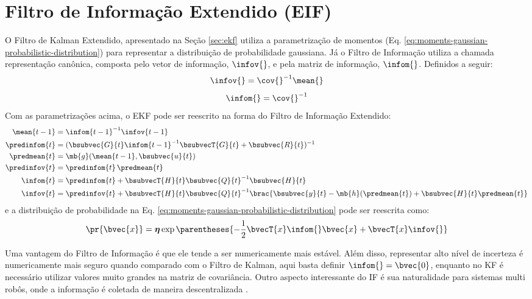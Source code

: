 \section{Filtro de Informação Extendido (EIF)}
O Filtro de Kalman Extendido, apresentado na Seção \ref{sec:ekf} utiliza a
parametrização de momentos (Eq. \ref{eq:moments-gaussian-probabilistic-distribution}) para representar a 
distribuição de probabilidade 
gaussiana. Já o Filtro de Informação utiliza a chamada representação canônica, composta pelo vetor de informação, $\infov{}$, e pela matriz de informação, $\infom{}$. Definidos a seguir:
\newcommand{\ifcorrespondence}{\infov{} = \cov{}^{-1} \mean{}}
\begin{equation}
  \ifcorrespondence 
  \label{eq:info-vector}
\end{equation}
\begin{equation}
  \infom{} = \cov{}^{-1}
  \label{eq:info-matrix}
\end{equation}
Com as parametrizações acima, o EKF pode ser reescrito na forma do Filtro de 
Informação Extendido:
\begin{align}
  \mean{t-1} &= \infom{t-1}^{-1} \infov{t-1}
  \label{eq:eif-mean-recuperation} \\
  \predinfom{t} &= (\bsubvec{G}{t} \infom{t-1}^{-1} \bsubvecT{G}{t} + \bsubvec{R}{t})^{-1}
  \label{eq:eif-info-matrix-prediction}\\
  \predmean{t} &= \mb{g}(\mean{t-1}, \bsubvec{u}{t})
  \label{eq:eif-mean-prediction} \\
  \predinfov{t} &= \predinfom{t}\,\predmean{t}
  \label{eq:eif-info-vector-prediction} \\
  \infom{t} &= \predinfom{t} + \bsubvecT{H}{t} \bsubvec{Q}{t}^{-1} \bsubvec{H}{t}
  \label{eq:eif-info-matrix-update} \\
  \infov{t} &= \predinfov{t} + \bsubvecT{H}{t}\bsubvec{Q}{t}^{-1} 
  \brac{\bsubvec{y}{t} - \mb{h}(\predmean{t}) + \bsubvec{H}{t}\predmean{t}}
  \label{eq:eif-info-vector-update}
\end{align}
e a distribuição de probabilidade na Eq. \ref{eq:moments-gaussian-probabilistic-distribution} pode ser reescrita como:
\begin{equation}
  \pr{\bvec{x}} = \boldsymbol{\eta} \exp\parentheses{-\frac{1}{2} 
  \bvecT{x} \infom{} \bvec{x} + \bvecT{x}\infov{}}
  \label{eq:canonical-gaussian-probabilistic-distribution}
\end{equation}

Uma vantagem do Filtro de Informação é que ele tende a ser numericamente mais estável. Além disso, 
representar alto nível de incerteza é numericamente mais seguro quando comparado 
com o Filtro de Kalman, aqui basta definir $\infom{} = \bvec{0}$, enquanto no KF 
é necessário utilizar valores muito grandes na matriz de covariância. Outro 
aspecto interessante do IF é sua naturalidade para sistemas multi robôs, onde a 
informação é coletada de maneira descentralizada \cite[p.~78]{bongard2006probabilistic}.

